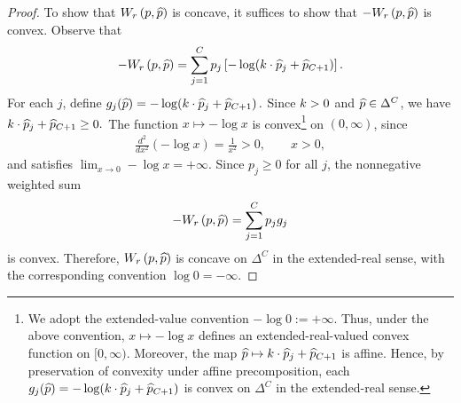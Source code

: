 \begin{proof}
    To show that $\W{r}$ is concave, it suffices to show that $-\W{r}$ is convex. Observe that
    \begin{align*}
        -\W{r} = \sum_{j=1}^{C}p_j\left[-\log\!\left(\costmult\cdot\phat_j+\phat_{C+1}\right)\right].
    \end{align*}
    For each $j$, define
    \(
    g_j(\widehat{p}) = -\log\!\left(k\cdot\widehat{p}_j+\widehat{p}_{C+1}\right).
    \)
    Since $k>0$ and $\widehat{p}\in\Delta^C$, we have
    \(
    k\cdot\widehat{p}_j+\widehat{p}_{C+1}\geq 0.
    \)
    The function $x\mapsto-\log x$ is convex\footnote{We adopt the extended-value convention
    \(
    -\log 0 := +\infty.
    \)
    Thus, under the above convention, $x\mapsto-\log x$ defines an
    extended-real-valued convex function on $[0,\infty)$. Moreover, the map
    \(
    \widehat{p}\mapsto k\cdot\widehat{p}_j+\widehat{p}_{C+1}
    \)
    is affine. Hence, by preservation of convexity under affine
    precomposition, each
    \(
    g_j(\widehat{p}) = -\log\!\left(k\cdot\widehat{p}_j+\widehat{p}_{C+1}\right)
    \)
    is convex on $\Delta^C$ in the extended-real sense.
    } on $(0,\infty)$, since
    \begin{align*}
        \frac{d^2}{dx^2}(-\log x)
        =
        \frac{1}{x^2}
        >
        0,
        \qquad x>0,
    \end{align*}
    and satisfies
    \(
    \lim_{x\rightarrow 0} -\log x = +\infty.
    \)
    Since $p_j\geq 0$
    for all $j$, the nonnegative weighted sum
    \begin{align*}
        -\W{r}
        =
        \sum_{j=1}^{C} p_j g_j
    \end{align*}
    is convex. Therefore, $\W{r}$ is concave on $\Delta^C$ in the
    extended-real sense, with the corresponding convention $\log 0=-\infty$.
\end{proof}
